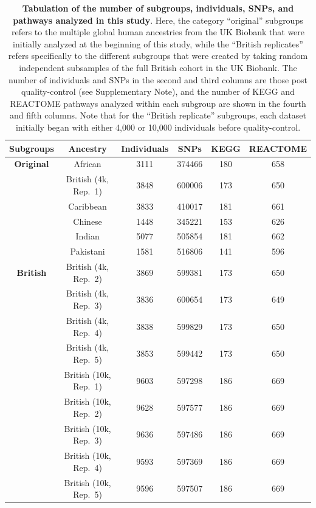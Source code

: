 \documentclass[10pt]{article}
\begin{document}
\begin{table}[ht]
\centering
\begin{tabular}{|c|c|c|c|c|c|}
  \hline
\textbf{Subgroups} & \textbf{Ancestry} & \textbf{Individuals} & \textbf{SNPs} & \textbf{KEGG} & \textbf{REACTOME} \\
[2pt]\hline
 \multirow{6.5}{*}{\textbf{Original}} &African & 3111 & 374466 & 180 & 658 \\ [2pt]
& British (4k, Rep.~1) & 3848 & 600006 & 173 & 650 \\ [2pt]
& Caribbean & 3833 & 410017 & 181 & 661 \\ [2pt]
& Chinese & 1448 & 345221 & 153 & 626 \\ [2pt]
& Indian & 5077 & 505854 & 181 & 662 \\ [2pt]
& Pakistani & 1581 & 516806 & 141 & 596 \\ [2pt]\hline
\multirow{9.5}{*}{\textbf{British}} & British (4k, Rep.~2) & 3869 & 599381 & 173 & 650 \\[2pt] 
& British (4k, Rep.~3) & 3836 & 600654 & 173 & 649 \\ [2pt]
& British (4k, Rep.~4) & 3838 & 599829 & 173 & 650 \\ [2pt]
& British (4k, Rep.~5) & 3853 & 599442 & 173 & 650 \\ [2pt]
& British (10k, Rep.~1) & 9603 & 597298 & 186 & 669 \\ [2pt]
& British (10k, Rep.~2) & 9628 & 597577 & 186 & 669 \\ [2pt]
& British (10k, Rep.~3) & 9636 & 597486 & 186 & 669 \\ [2pt]
& British (10k, Rep.~4) & 9593 & 597369 & 186 & 669 \\ [2pt]
& British (10k, Rep.~5) & 9596 & 597507 & 186 & 669 \\ [2pt]
  \hline
\end{tabular}
\caption{\textbf{Tabulation of the number of subgroups, individuals, SNPs, and pathways analyzed in this study}. Here, the category ``original'' subgroups refers to the multiple global human ancestries from the UK Biobank that were initially analyzed at the beginning of this study, while the ``British replicates'' refers specifically to the different subgroups that were created by taking random independent subsamples of the full British cohort in the UK Biobank. The number of individuals and SNPs in the second and third columns are those post quality-control (see Supplementary Note), and the number of KEGG and REACTOME pathways analyzed within each subgroup are shown in the fourth and fifth columns. Note that for the ``British replicate'' subgroups, each dataset initially began with either 4,000 or 10,000 individuals before quality-control.}
\label{InterPath-Supp-Table-UKBPopStats}
\end{table}
\end{document}
